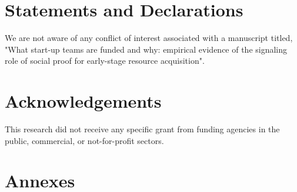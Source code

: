 \documentclass[12pt]{article}
\begin{document}



\clearpage





\clearpage
\section{Statements and Declarations}
We are not aware of any conflict of interest associated with a manuscript titled, "What start-up teams are funded and why: empirical evidence of the signaling role of social proof for early-stage resource acquisition".

\section{Acknowledgements}
This research did not receive any specific grant from funding agencies in the public, commercial, or not-for-profit sectors.

\section{Annexes}

\end{document}
